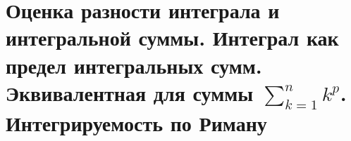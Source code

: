 \section{Оценка разности интеграла и интегральной суммы. Интеграл как предел интегральных сумм. Эквивалентная для суммы $\sum_{k=1}^n k^p$. Интегрируемость по Риману}
